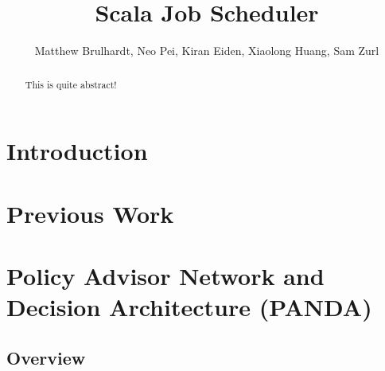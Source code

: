 \documentclass{article}
\title{Scala Job Scheduler}
\author{Matthew Brulhardt, Neo Pei, Kiran Eiden, Xiaolong Huang, Sam Zurl}
\begin{document}
	\maketitle

	\begin{abstract}
		This is quite abstract!
	\end{abstract}

	\section{Introduction}

	\section{Previous Work}


	\section{Policy Advisor Network and Decision Architecture (PANDA)}


	\subsection{Overview}


\end{document}
